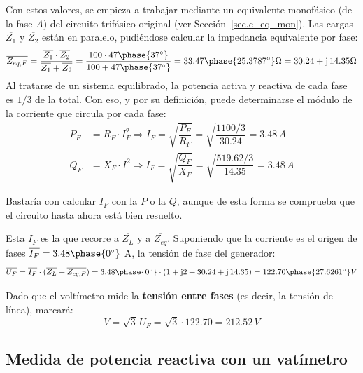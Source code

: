 \documentclass[11pt]{book} %
\begin{document}
\begin{example}
Con estos valores, se empieza a trabajar mediante un equivalente monofásico (de la fase $A$) del circuito trifásico original (ver Sección~\ref{sec.c_eq_mon}). Las cargas $\overline{Z_1}$ y $\overline{Z_2}$ están en paralelo, pudiéndose calcular la impedancia equivalente por fase:
\begin{equation*}
    \overline{Z_{eq,F}}=\dfrac{\overline{Z_1}\cdot\overline{Z_2}}{\overline{Z_1}+\overline{Z_2}}=\dfrac{100\cdot 47\phase{37^\circ}}{100+ 47\phase{37^\circ}}=33.47\phase{25.3787^\circ}\Omega=30.24+\mathrm{j}\,14.35\Omega
\end{equation*}
Al tratarse de un sistema equilibrado, la potencia activa y reactiva de cada fase es $1/3$ de la total. Con eso, y por su definición, puede determinarse el módulo de la corriente que circula por cada fase:
\begin{align*}
    P_F&=R_F\cdot I_F^2\Rightarrow I_F=\sqrt{\dfrac{P_F}{R_F}}=\sqrt{\dfrac{1100/3}{30.24}}=3.48\,A\\
    Q_F&=X_F\cdot I^2\Rightarrow I_F=\sqrt{\dfrac{Q_F}{X_F}}=\sqrt{\dfrac{519.62/3}{14.35}}=3.48\,A
\end{align*}
\begin{remark}
    Bastaría con calcular $I_F$ con la $P$ o la $Q$, aunque de esta forma se comprueba que el circuito hasta ahora está bien resuelto. 
\end{remark}
Esta $I_F$ es la que recorre a $\overline{Z_L}$ y a $\overline{Z_{eq}}$. Suponiendo que la corriente es el origen de fases $\overline{I_F}=3.48\phase{0^\circ}$ A, la tensión de fase del generador:
\begin{equation*}
    \overline{U_F}=\overline{I_F}\cdot (\overline{Z_L}+\overline{Z_{eq,F}})=3.48\phase{0^\circ}\cdot(1+\mathrm{j}2+30.24+\mathrm{j}\,14.35)=122.70\phase{27.6261^\circ} V
\end{equation*}

Dado que el voltímetro mide la \textbf{tensión entre fases} (es decir, la tensión de línea), marcará:
\begin{equation*}
    V=\sqrt{3}\,U_F=\sqrt{3}\cdot 122.70=212.52\,V
\end{equation*}
\end{example}


\subsection{Medida de potencia reactiva con un vatímetro}
\end{document}
